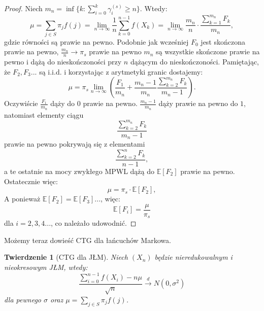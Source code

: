 \documentclass[a4paper]{article}
\theoremstyle{defn}
\theoremstyle{theorem}
\newtheorem{theorem}[defn]{Twierdzenie}
\theoremstyle{lemma}
\theoremstyle{cor}
\theoremstyle{fact}
\begin{document}
\begin{proof}
Niech $m_n = \inf \{k: \sum\limits_{i=0}^k \gamma_i^{(s)} \geq n\}$. Wtedy:
$$\mu = \sum\limits_{j \in S} \pi_jf(j) = \lim\limits_{n \to \infty} \frac{1}{n} \sum\limits_{k=0}^{n-1}f(X_k) = \lim\limits_{n \to \infty} \frac{m_n}{n} \cdot \frac{\sum\limits_{k=1}^{m_n} F_k}{m_n},$$
gdzie równości są prawie na pewno. Podobnie jak wcześniej $F_0$ jest skończona prawie na pewno, $\frac{m_n}{n} \to \pi_s$ prawie na pewno $m_n$ są wszystkie skończone prawie na pewno i dążą do nieskończoności przy $n$ dążącym do nieskończoności. Pamiętając, że $F_2, F_3...$ są i.i.d. i korzystając z arytmetyki granic dostajemy:
$$\mu = \pi_s \lim\limits_{n \to \infty}\left( \frac{F_1}{m_n} + \frac{m_n-1}{m_n} \frac{\sum\limits_{k=2}^{m_n} F_k}{m_n-1}\right).$$
Oczywiście $\frac{F_1}{m_n}$ dąży do $0$ prawie na pewno. $\frac{m_n-1}{m_n}$ dąży prawie na pewno do $1$, natomiast elementy ciągu $$\frac{\sum\limits_{k=2}^{m_n} F_k}{m_n-1}$$ prawie na pewno pokrywają się z elementami $$\frac{\sum\limits_{k=2}^{n} F_k}{n-1},$$ a te ostatnie na mocy zwykłego MPWL dążą do $\mathbb{E}[F_2]$ prawie na pewno. Ostatecznie więc:
$$\mu = \pi_s \cdot \mathbb{E}[F_2],$$
A ponieważ $\mathbb{E}[F_2] = \mathbb{E}[F_3] ... $, więc:
$$\mathbb{E}[F_i] = \frac{\mu}{\pi_s}$$
dla $i=2,3,4...$, co należało udowodnić.
\end{proof}
Możemy teraz dowieść CTG dla łańcuchów Markowa.\\
\begin{theorem}[CTG dla JŁM]\label{theorem2.6.5}
Niech $(X_n)$ będzie nieredukowalnym i nieokresowym JŁM, wtedy:
$$ \frac{\sum\limits_{i=0}^{n-1} f(X_i) - n\mu}{\sqrt{n}} \overset{d}{\to} N(0, \sigma^2)$$
dla pewnego $\sigma$ oraz $\mu = \sum\limits_{j \in S} \pi_j f(j)$.
\end{theorem}
\end{document}
